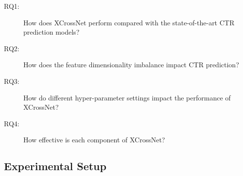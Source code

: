 \documentclass[letterpaper]{article} \usepackage{aaai21}  \usepackage{times}  \usepackage{helvet} \usepackage{courier}  \usepackage[hyphens]{url}  \usepackage{graphicx} \urlstyle{rm} \def\UrlFont{\rm}  \usepackage{natbib}  \usepackage{caption} \frenchspacing  \setlength{\pdfpagewidth}{8.5in}  \setlength{\pdfpageheight}{11in}  \usepackage{graphicx}
\begin{document}
\begin{description}
	\vspace{-0.1cm}
	\item[RQ1:] How does XCrossNet perform compared with the state-of-the-art CTR prediction models?
	\vspace{-0.1cm}
	\item[RQ2:] How does the feature dimensionality imbalance impact CTR prediction?
	\vspace{-0.1cm}
	\item[RQ3:] How do different hyper-parameter settings impact the performance of XCrossNet?
	\vspace{-0.1cm}
	\item[RQ4:] How effective is each component of XCrossNet?

\end{description}


\begin{table}[h]
	\vspace{-0.2cm}
	\centering
	\fontsize{8pt}{11pt} 
	\caption{Statistics of Experimental Datasets.}
	\label{table1}
	\vspace{-0.3cm}
\end{table}


\vspace{-0.3cm}
\subsection{Experimental Setup}
\end{document}

